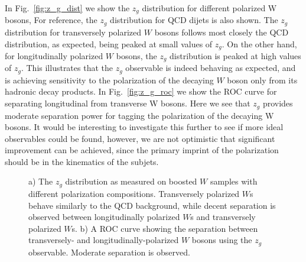 \documentclass[11pt,letterpaper]{article}
\DeclareRobustCommand{\Fig}[1]{Fig.~\ref{#1}}
\begin{document}
In \Fig{fig:z_g_dist} we show the $z_g$ distribution for different polarized W bosons, For reference, the $z_g$ distribution for QCD dijets is also shown. The $z_g$ distribution for transversely polarized $W$ bosons follows most closely the QCD distribution, as expected, being peaked at small values of $z_g$. On the other hand, for longitudinally polarized $W$ bosons, the $z_g$ distribution is peaked at high values of $z_g$. This illustrates that the $z_g$ observable is indeed behaving as expected, and is achieving sensitivity to the polarization of the decaying $W$ boson only from its hadronic decay products. In \Fig{fig:z_g_roc} we show  the ROC curve for separating longitudinal from transverse W bosons. Here we see that $z_g$ provides moderate separation power for tagging the polarization of the decaying W bosons. It would be interesting to investigate this further to see if more ideal observables could be found, however, we are not optimistic that significant improvement can be achieved, since the primary imprint of the polarization should be in the kinematics of the subjets.

\begin{figure}
\begin{center}
\end{center}
\caption{a) The $z_g$ distribution as measured on boosted $W$ samples with different polarization compositions. Transversely polarized $W$s behave similarly to the QCD background, while decent separation is observed between longitudinally polarized $W$s and transversely polarized $W$s. b) A ROC curve showing the separation between transversely- and longitudinally-polarized $W$ bosons using the $z_g$ observable. Moderate separation is observed.}
\end{figure}
\end{document}
